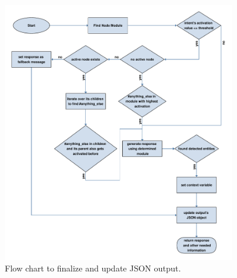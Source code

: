\begin{figure}[!h]
    \centering
    \includegraphics[width=0.9\textwidth]{img/bot_updated.pdf}
    \caption{Flow chart to finalize and update JSON output.}
    \label{fig:flowBot}
\end{figure}

